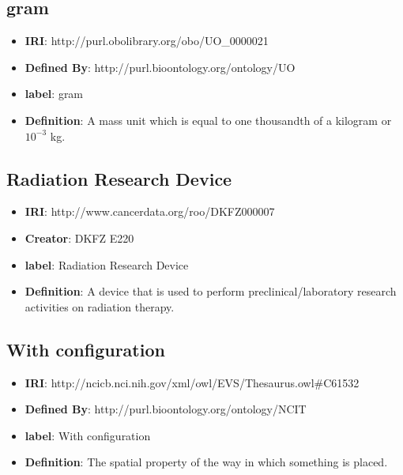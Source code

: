 \documentclass[a4paper,12pt,oneside]{article}
\begin{document}
  \subsection {gram}

  \begin{itemize}
     \item \textbf{IRI}: http://purl.obolibrary.org/obo/UO\_0000021
     \item \textbf{Defined By}: http://purl.bioontology.org/ontology/UO
     \item \textbf{label}: gram
     \item \textbf{Definition}: A mass unit which is equal to one thousandth of a kilogram or $10^{-3}$ kg.
  \end{itemize}
  
  \subsection{Radiation Research Device}

\begin{itemize}
	\item \textbf{IRI}: http://www.cancerdata.org/roo/DKFZ000007
	\item \textbf{Creator}: DKFZ E220
	\item \textbf{label}: Radiation Research Device
	\item \textbf{Definition}: A device that is used to perform preclinical/laboratory research activities on radiation therapy.
\end{itemize}
  
  \subsection{With configuration}

\begin{itemize}
	\item \textbf{IRI}: http://ncicb.nci.nih.gov/xml/owl/EVS/Thesaurus.owl\#C61532
	\item \textbf{Defined By}: http://purl.bioontology.org/ontology/NCIT
	\item \textbf{label}: With configuration
	\item \textbf{Definition}: The spatial property of the way in which something is placed.
\end{itemize}

  
  
  \nocite{JS06}

  \newpage
  \printbibliography
  
\end{document}
